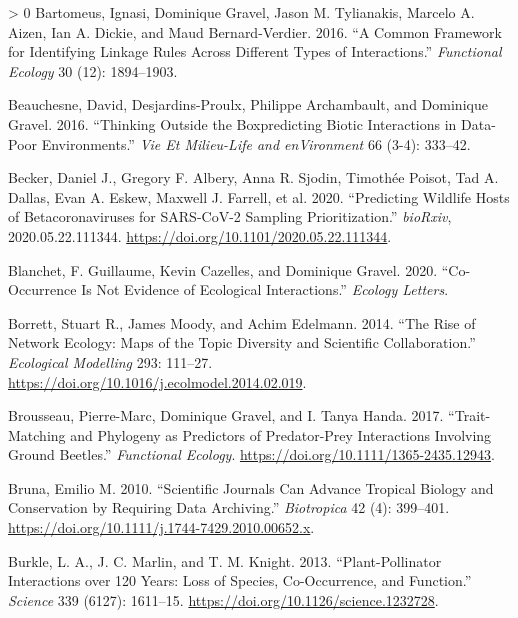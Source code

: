 \documentclass[11pt]{article}
\newlength{\cslhangindent}
\newenvironment{CSLReferences}[3] %
 {%
  \setlength{\parindent}{0pt}
  \ifodd #1 \everypar{\setlength{\hangindent}{\cslhangindent}}\ignorespaces\fi
  \ifnum #2 > 0
  \setlength{\parskip}{#2\baselineskip}
  \fi
 }%
 {}
\begin{document}
\begin{CSLReferences}{1}{0}
\leavevmode\hypertarget{ref-Bartomeus2016ComFra}{}%
Bartomeus, Ignasi, Dominique Gravel, Jason M. Tylianakis, Marcelo A.
Aizen, Ian A. Dickie, and Maud Bernard-Verdier. 2016. {``A Common
Framework for Identifying Linkage Rules Across Different Types of
Interactions.''} \emph{Functional Ecology} 30 (12): 1894--1903.

\leavevmode\hypertarget{ref-Beauchesne2016ThiOut}{}%
Beauchesne, David, Desjardins-Proulx, Philippe Archambault, and
Dominique Gravel. 2016. {``Thinking Outside the Boxpredicting Biotic
Interactions in Data-Poor Environments.''} \emph{Vie Et Milieu-Life and
enVironment} 66 (3-4): 333--42.

\leavevmode\hypertarget{ref-Becker2020PreWil}{}%
Becker, Daniel J., Gregory F. Albery, Anna R. Sjodin, Timothée Poisot,
Tad A. Dallas, Evan A. Eskew, Maxwell J. Farrell, et al. 2020.
{``Predicting Wildlife Hosts of Betacoronaviruses for SARS-CoV-2
Sampling Prioritization.''} \emph{bioRxiv}, 2020.05.22.111344.
\url{https://doi.org/10.1101/2020.05.22.111344}.

\leavevmode\hypertarget{ref-Blanchet2020CooNot}{}%
Blanchet, F. Guillaume, Kevin Cazelles, and Dominique Gravel. 2020.
{``Co-Occurrence Is Not Evidence of Ecological Interactions.''}
\emph{Ecology Letters}.

\leavevmode\hypertarget{ref-Borrett2014RisNet}{}%
Borrett, Stuart R., James Moody, and Achim Edelmann. 2014. {``The Rise
of Network Ecology: Maps of the Topic Diversity and Scientific
Collaboration.''} \emph{Ecological Modelling} 293: 111--27.
\url{https://doi.org/10.1016/j.ecolmodel.2014.02.019}.

\leavevmode\hypertarget{ref-Brousseau2017TraPhy}{}%
Brousseau, Pierre-Marc, Dominique Gravel, and I. Tanya Handa. 2017.
{``Trait-Matching and Phylogeny as Predictors of Predator-Prey
Interactions Involving Ground Beetles.''} \emph{Functional Ecology}.
\url{https://doi.org/10.1111/1365-2435.12943}.

\leavevmode\hypertarget{ref-Bruna2010SciJou}{}%
Bruna, Emilio M. 2010. {``Scientific Journals Can Advance Tropical
Biology and Conservation by Requiring Data Archiving.''}
\emph{Biotropica} 42 (4): 399--401.
\url{https://doi.org/10.1111/j.1744-7429.2010.00652.x}.

\leavevmode\hypertarget{ref-Burkle2013PlaInt}{}%
Burkle, L. A., J. C. Marlin, and T. M. Knight. 2013. {``Plant-Pollinator
Interactions over 120 Years: Loss of Species, Co-Occurrence, and
Function.''} \emph{Science} 339 (6127): 1611--15.
\url{https://doi.org/10.1126/science.1232728}.


\end{CSLReferences}
\end{document}

